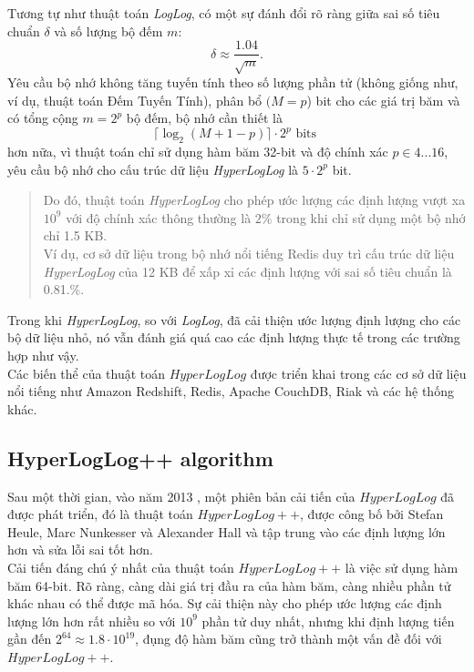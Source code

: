 \documentclass[letterpaper,13pt]{article}
\theoremstyle{mytheor}
\begin{document}
Tương tự như thuật toán \textit{LogLog}, có một sự đánh đổi rõ ràng giữa sai số tiêu chuẩn $\delta$ và số lượng bộ đếm $m$:
\[\delta \approx \frac{1.04}{\sqrt{m}}.\]
\indent Yêu cầu bộ nhớ không tăng tuyến tính theo số lượng phần tử (không giống như, ví dụ, thuật toán Đếm Tuyến Tính), 
phân bổ $(M=p$) bit cho các giá trị băm và có tổng cộng $m = 2^p$ bộ đếm, bộ nhớ cần thiết là
\[\lceil\log_2\left(M + 1 - p\right)\rceil\cdot2^p \text{ bits }\]
hơn nữa, vì thuật toán chỉ sử dụng hàm băm 32-bit và độ chính xác $p \in 4...16$, yêu cầu bộ nhớ cho 
cấu trúc dữ liệu \textit{HyperLogLog} là $5\cdot 2^p$ bit.\\
\vspace{0.4cm}
\begin{quote}
    Do đó, thuật toán \textit{HyperLogLog} cho phép ước lượng các định lượng vượt xa $10^9$ với độ chính xác thông thường là $2\%$ 
    trong khi chỉ sử dụng một bộ nhớ chỉ 1.5 KB.\\
    Ví dụ, cơ sở dữ liệu trong bộ nhớ nổi tiếng Redis duy trì cấu trúc dữ liệu \textit{HyperLogLog} của 12 KB để xấp xỉ các định lượng 
    với sai số tiêu chuẩn là 0.81.\%.
    \vspace{0.25cm}
\end{quote}

Trong khi \textit{HyperLogLog}, so với \textit{LogLog}, đã cải thiện ước lượng định lượng cho các bộ dữ liệu nhỏ, 
nó vẫn đánh giá quá cao các định lượng thực tế trong các trường hợp như vậy.\\

Các biến thể của thuật toán $HyperLogLog$ được triển khai trong các cơ sở dữ liệu nổi tiếng như Amazon Redshift, Redis, Apache CouchDB, Riak 
và các hệ thống khác.
\subsection{HyperLogLog++ algorithm}
Sau một thời gian, vào năm 2013 \cite{chabchoub2010sliding}, một phiên bản cải tiến của $HyperLogLog$ đã được phát triển, 
đó là thuật toán $HyperLogLog++$, được công bố bởi Stefan Heule, Marc Nunkesser và Alexander Hall và tập trung vào 
các định lượng lớn hơn và sửa lỗi sai tốt hơn.\\

Cải tiến đáng chú ý nhất của thuật toán $HyperLogLog++$ là việc sử dụng hàm băm 64-bit. Rõ ràng, 
càng dài giá trị đầu ra của hàm băm, càng nhiều phần tử khác nhau có thể được mã hóa. Sự cải thiện này cho phép ước lượng 
các định lượng lớn hơn rất nhiều so với $10^9$ phần tử duy nhất, nhưng khi định lượng tiến gần đến $2^64 \approx 1.8\cdot 10^{19}$, 
đụng độ hàm băm cũng trở thành một vấn đề đối với $HyperLogLog++$.\\
\end{document}
